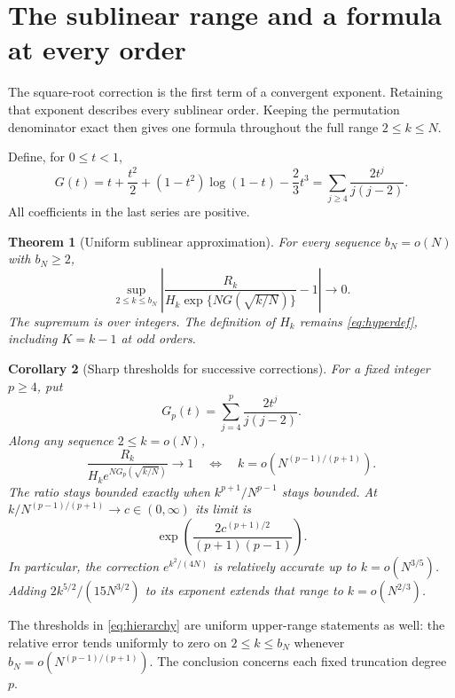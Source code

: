\documentclass[11pt]{article}
\newtheorem{theorem}{Theorem}[section]
\newtheorem{corollary}[theorem]{Corollary}
\theoremstyle{definition}
\theoremstyle{remark}
\newcommand{\1}{\mathbf 1}
\begin{document}
\clearpage
\section{The sublinear range and a formula at every order}\label{sec:asymptotics}

The square-root correction is the first term of a convergent exponent. Retaining that exponent describes every sublinear order. Keeping the permutation denominator exact then gives one formula throughout the full range $2\le k\le N$.

Define, for $0\le t<1$,
\begin{equation}\label{eq:actionG}
G(t)=t+\frac{t^2}{2}+(1-t^2)\log(1-t)-\frac23t^3
=\sum_{j\ge4}\frac{2t^j}{j(j-2)}.
\end{equation}
All coefficients in the last series are positive.

\begin{theorem}[Uniform sublinear approximation]\label{thm:sublinear}
For every sequence $b_N=o(N)$ with $b_N\ge2$,
\begin{equation}\label{eq:sublinear}
\sup_{2\le k\le b_N}
\left|\frac{R_k}{H_k\exp\{NG(\sqrt{k/N})\}}-1\right|
\longrightarrow0.
\end{equation}
The supremum is over integers. The definition of $H_k$ remains \eqref{eq:hyperdef}, including $K=k-1$ at odd orders.
\end{theorem}

\begin{corollary}[Sharp thresholds for successive corrections]\label{cor:hierarchy}
For a fixed integer $p\ge4$, put
\[
G_p(t)=\sum_{j=4}^{p}\frac{2t^j}{j(j-2)}.
\]
Along any sequence $2\le k=o(N)$,
\begin{equation}\label{eq:hierarchy}
\frac{R_k}{H_ke^{NG_p(\sqrt{k/N})}}\longrightarrow1
\quad\Longleftrightarrow\quad
k=o\left(N^{(p-1)/(p+1)}\right).
\end{equation}
The ratio stays bounded exactly when $k^{p+1}/N^{p-1}$ stays bounded. At $k/N^{(p-1)/(p+1)}\to c\in(0,\infty)$ its limit is
\begin{equation}\label{eq:hierarchyboundary}
\exp\left(\frac{2c^{(p+1)/2}}{(p+1)(p-1)}\right).
\end{equation}
In particular, the correction $e^{k^2/(4N)}$ is relatively accurate up to $k=o(N^{3/5})$. Adding $2k^{5/2}/(15N^{3/2})$ to its exponent extends that range to $k=o(N^{2/3})$.
\end{corollary}

The thresholds in \eqref{eq:hierarchy} are uniform upper-range statements as well: the relative error tends uniformly to zero on $2\le k\le b_N$ whenever $b_N=o(N^{(p-1)/(p+1)})$. The conclusion concerns each fixed truncation degree $p$.
\end{document}
